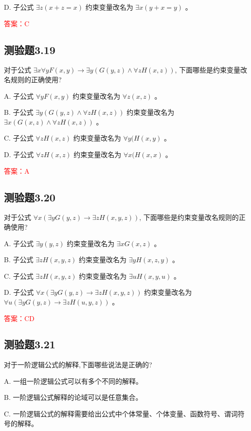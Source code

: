 \documentclass[UTF8, heading=true]{ctexart}
\begin{document}
D. 
子公式 $\exists z(x+z=x)$ 约束变量改名为 $\exists x(y+x=y)$ 。

\textcolor{red}{答案：C}

\subsection{测验题3.19}

对于公式 $\exists x \forall y F(x, y) \rightarrow \exists y(G(y, z) \wedge \forall z H(x, z))$, 下面哪些是约束变量改名规则的正确使用?

A. 子公式 $\forall y F(x, y)$ 约束变量改名为 $\forall z(x, z)$ 。

B. 子公式 $\exists y(G(y, z) \wedge \forall z H(x, z))$ 约束变量改名为 $\exists x(G(x, z) \wedge \forall z H(x, z))$ 。

C. 子公式 $\forall z H(x, z)$ 约束变量改名为 $\forall y(H(x, y)$ 。

D. 子公式 $\forall z H(x, z)$ 约束变量改名为 $\forall x(H(x, x)$ 。

\textcolor{red}{答案：A}

\subsection{测验题3.20}

对于公式 $\forall x(\exists y G(y, z) \rightarrow \exists z H(x, y, z))$, 下面哪些是约束变量改名规则的正确使用?

A. 子公式 $\exists y(y, z)$ 约束变量改名为 $\exists x G(x, z)$ 。

B. 
子公式 $\exists z H(x, y, z)$ 约束变量改名为 $\exists y H(x, z, y)$ 。

C. 
子公式 $\exists z H(x, y, z)$ 约束变量改名为 $\exists u H(x, y, u)$ 。

D. 
子公式 $\forall x(\exists y G(y, z) \rightarrow \exists z H(x, y, z))$ 约束变量改名为 $\forall u(\exists y G(y, z) \rightarrow \exists z H(u, y, z))$ 。

\textcolor{red}{答案：CD}

\subsection{测验题3.21}

对于一阶逻辑公式的解释,下面哪些说法是正确的?

A. 一组一阶逻辑公式可以有多个不同的解释。

B. 一阶逻辑公式解释的论域可以是任意集合。

C. 一阶逻辑公式的解释需要给出公式中个体常量、个体变量、函数符号、谓词符号的解释。
\end{document}
